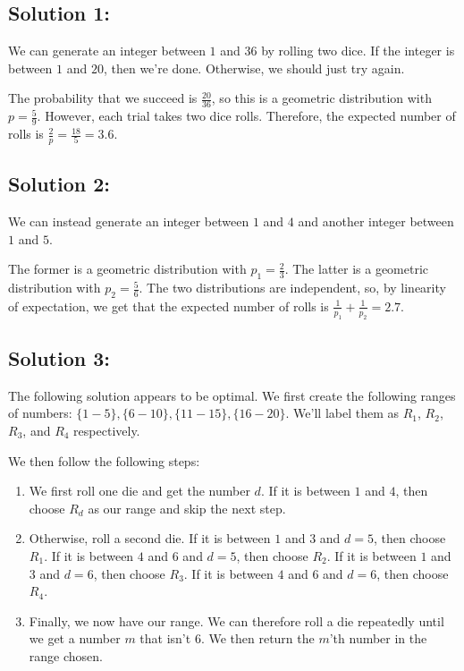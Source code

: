 \documentclass{article}
\begin{document}
\subsection{Solution 1:}

We can generate an integer between $1$ and $36$ by rolling two dice. If the integer is between $1$ and $20$, then we're done. Otherwise, we should just try again.

The probability that we succeed is $\frac{20}{36}$, so this is a geometric distribution with $p = \frac{5}{9}$. However, each trial takes two dice rolls. Therefore, the expected number of rolls is $\frac{2}{p} = \frac{18}{5} = \boxed{3.6}$.

\vfill

\subsection{Solution 2:}

We can instead generate an integer between $1$ and $4$ and another integer between $1$ and $5$.

The former is a geometric distribution with $p_1 = \frac{2}{3}$. The latter is a geometric distribution with $p_2 = \frac{5}{6}$. The two distributions are independent, so, by linearity of expectation, we get that the expected number of rolls is $\frac{1}{p_1} + \frac{1}{p_2} = \boxed{2.7}$.

\vfill

\subsection{Solution 3:}

The following solution appears to be optimal. We first create the following ranges of numbers: $\{1-5\}, \{6-10\}, \{11-15\}, \{16-20\}$. We'll label them as $R_1$, $R_2$, $R_3$, and $R_4$ respectively.

We then follow the following steps:

\begin{enumerate}
    \item We first roll one die and get the number $d$. If it is between $1$ and $4$, then choose $R_d$ as our range and skip the next step.
    \item Otherwise, roll a second die. If it is between $1$ and $3$ and $d = 5$, then choose $R_1$. If it is between $4$ and $6$ and $d = 5$, then choose $R_2$. If it is between $1$ and $3$ and $d = 6$, then choose $R_3$. If it is between $4$ and $6$ and $d = 6$, then choose $R_4$.
    \item Finally, we now have our range. We can therefore roll a die repeatedly until we get a number $m$ that isn't $6$. We then return the $m$'th number in the range chosen.
\end{enumerate}
\end{document}
